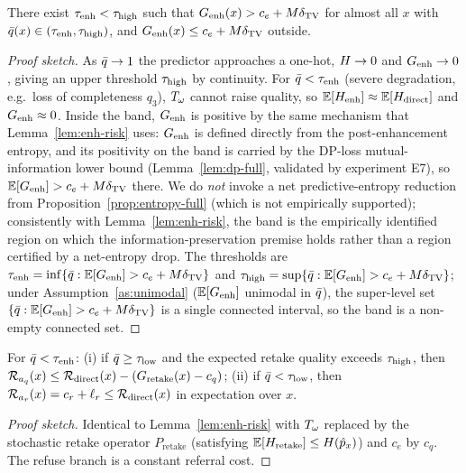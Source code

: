 \begin{lemma}\label{lem:window}
There exist $\tau_{\mathrm{enh}}<\tau_{\mathrm{high}}$ such that $G_{\mathrm{enh}}(x) > c_e + M\delta_{\mathrm{TV}}$ for almost all $x$ with
$\bar{q}(x)\in(\tau_{\mathrm{enh}},\tau_{\mathrm{high}})$, and $G_{\mathrm{enh}}(x)\leq c_e+M\delta_{\mathrm{TV}}$ outside.
\end{lemma}
\begin{proof}[Proof sketch]
As $\bar{q}\to 1$ the predictor approaches a one-hot, $H\to 0$ and $G_{\mathrm{enh}}\to 0$, giving an
upper threshold $\tau_{\mathrm{high}}$ by continuity. For $\bar{q}<\tau_{\mathrm{enh}}$ (severe degradation, e.g.\ loss
of completeness $q_3$), $T_\omega$ cannot raise quality, so $\operatorname*{\mathbb{E}}[H_{\mathrm{enh}}]\approx\operatorname*{\mathbb{E}}[H_{\mathrm{direct}}]$
and $G_{\mathrm{enh}}\approx 0$. Inside the band, $G_{\mathrm{enh}}$ is positive by the same mechanism that
Lemma~\ref{lem:enh-risk} uses: $G_{\mathrm{enh}}$ is defined directly from the post-enhancement entropy, and
its positivity on the band is carried by the DP-loss mutual-information lower bound
(Lemma~\ref{lem:dp-full}, validated by experiment E7), so $\operatorname*{\mathbb{E}}[G_{\mathrm{enh}}]>c_e+M\delta_{\mathrm{TV}}$ there. We
do \emph{not} invoke a net predictive-entropy reduction from
Proposition~\ref{prop:entropy-full} (which is not empirically supported); consistently with
Lemma~\ref{lem:enh-risk}, the band is the empirically identified region on which the
information-preservation premise holds rather than a region certified by a net-entropy drop. The
thresholds are
$\tau_{\mathrm{enh}}=\inf\{\bar{q}:\operatorname*{\mathbb{E}}[G_{\mathrm{enh}}]>c_e+M\delta_{\mathrm{TV}}\}$ and
$\tau_{\mathrm{high}}=\sup\{\bar{q}:\operatorname*{\mathbb{E}}[G_{\mathrm{enh}}]>c_e+M\delta_{\mathrm{TV}}\}$; under
Assumption~\ref{as:unimodal} ($\operatorname*{\mathbb{E}}[G_{\mathrm{enh}}]$ unimodal in $\bar{q}$), the super-level set
$\{\bar{q}:\operatorname*{\mathbb{E}}[G_{\mathrm{enh}}]>c_e+M\delta_{\mathrm{TV}}\}$ is a single connected interval, so the band is a
non-empty connected set.
\end{proof}

\begin{lemma}\label{lem:query-refuse}
For $\bar{q}<\tau_{\mathrm{enh}}$: (i) if $\bar{q}\geq\tau_{\mathrm{low}}$ and the expected retake quality exceeds
$\tau_{\mathrm{high}}$, then $\mathcal{R}_{a_q}(x)\leq\mathcal{R}_{\mathrm{direct}}(x)-(G_{\mathrm{retake}}(x)-c_q)$; (ii) if $\bar{q}<\tau_{\mathrm{low}}$,
then $\mathcal{R}_{a_r}(x)=c_r+\ell_r\leq\mathcal{R}_{\mathrm{direct}}(x)$ in expectation over $x$.
\end{lemma}
\begin{proof}[Proof sketch]
Identical to Lemma~\ref{lem:enh-risk} with $T_\omega$ replaced by the stochastic retake operator
$P_{\mathrm{retake}}$ (satisfying $\operatorname*{\mathbb{E}}[H_{\mathrm{retake}}]\leq H(\hat{p}_x)$) and $c_e$
by $c_q$. The refuse branch is a constant referral cost.
\end{proof}

